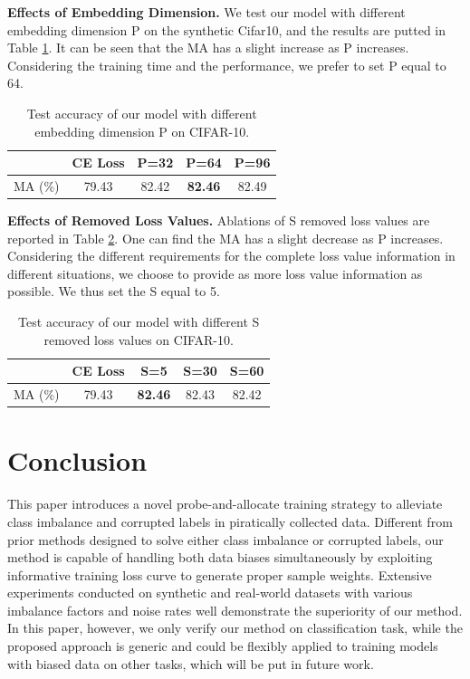 \documentclass[letterpaper]{article} %
\newcommand{\bd}[1]{\textbf{#1}}
\begin{document}
\noindent\bd{Effects of Embedding Dimension.} We test our model with different embedding dimension P on the synthetic Cifar10, and the results are putted in Table \ref{tab:cifar10_P}.
It can be seen that the MA has a slight increase as P increases.
Considering the training time and the performance, we prefer to set P equal to 64.
\begin{table}[h]
\begin{center}
\tabcolsep=0.37cm
\begin{tabular}{c|c|c|c|c}
\hline
& CE Loss &  P=32  &  P=64 &  P=96 \\
\hline
MA (\%)  & 79.43 & 82.42 & \textbf{82.46 } & 82.49\\
\hline
\end{tabular}%
\caption{Test accuracy of our model with different embedding dimension P on CIFAR-10.} %
\label{tab:cifar10_P}
\end{center}
\end{table}



\noindent\bd{Effects of Removed Loss Values.} Ablations of S removed loss values are reported in Table \ref{tab:cifar10_s}.
One can find the MA has a slight decrease as P increases.
Considering the different requirements for the complete loss value information in different situations, we choose to provide as more loss value information as possible.
We thus set the S equal to 5.
\begin{table}[h]
\begin{center}
\tabcolsep=0.37cm
\begin{tabular}{c|c|c|c|c}
\hline
& CE Loss &  S=5  &  S=30 &  S=60 \\
\hline
MA (\%)  & 79.43 & \textbf{82.46 } & 82.43 & 82.42\\
\hline
\end{tabular}%
\caption{Test accuracy of our model with different S removed loss values on CIFAR-10.} %
\label{tab:cifar10_s}
\end{center}
\end{table}


\vspace{-7.63mm}
\section{Conclusion}\label{sec:conclusion}

This paper introduces a novel probe-and-allocate training strategy to alleviate class imbalance and corrupted labels in piratically collected data.
Different from prior methods designed to solve either class imbalance or corrupted labels, our method is capable of handling both data biases simultaneously by exploiting informative training loss curve to generate proper sample weights.
Extensive experiments conducted on synthetic and real-world datasets with various imbalance factors and noise rates well demonstrate the superiority of our method.
In this paper, however, we only verify our method on classification task, while the proposed approach is generic and could be flexibly applied to training models with biased data on other tasks, which  will be put in future work.
\end{document}

